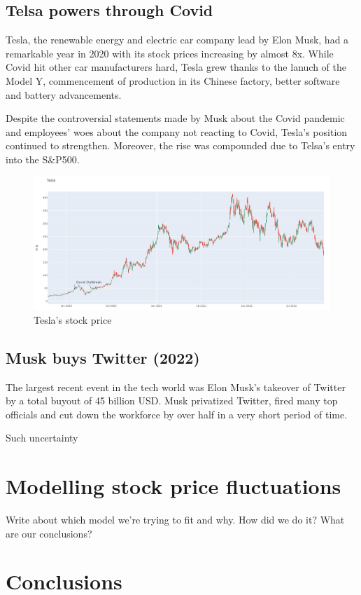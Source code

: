 \documentclass[11pt, twocolumn]{article}
\begin{document}
\begin{justify}
\subsection{Telsa powers through Covid}
Tesla, the renewable energy and electric car company lead by Elon Musk, had a remarkable year in 2020 with its stock prices increasing by almost 8x. While Covid hit other car manufacturers hard,
Tesla grew thanks to the lanuch of the Model Y, commencement of production in its Chinese factory, better software and battery advancements.
\vspace{1em}


Despite the controversial statements made by Musk about the Covid pandemic and employees' woes about the company not reacting to Covid, Tesla's position continued to strengthen.
Moreover, the rise was compounded due to Telsa's entry into the S\&P500.
\vspace{-5pt}

\begin{figure}[h]
  \centering
  \includegraphics[scale=0.24]{figs/tesla.jpg}
  \caption*{Tesla's stock price}
\end{figure}


\subsection{Musk buys Twitter (2022)}
The largest recent event in the tech world was Elon Musk's takeover of Twitter by a total buyout of 45 billion USD.
Musk privatized Twitter, fired many top officials and cut down the workforce by over half in a very short period of time.
\vspace{1em}


Such uncertainty
\vspace{-5pt}




\section{\huge Modelling stock price fluctuations}
\vspace{-5pt}
Write about which model we're trying to fit and why. How did we do it? What are our conclusions?



\section{\huge Conclusions}

\vspace{-5pt}



\end{justify}
\end{document}
